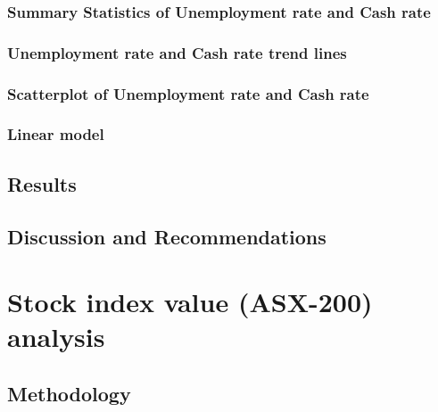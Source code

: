 \documentclass[11pt,a4paper,]{article}
\begin{document}
\hypertarget{summary-statistics-of-unemployment-rate-and-cash-rate}{%
\subsubsection{Summary Statistics of Unemployment rate and Cash rate}\label{summary-statistics-of-unemployment-rate-and-cash-rate}}

\hypertarget{unemployment-rate-and-cash-rate-trend-lines}{%
\subsubsection{Unemployment rate and Cash rate trend lines}\label{unemployment-rate-and-cash-rate-trend-lines}}

\hypertarget{scatterplot-of-unemployment-rate-and-cash-rate}{%
\subsubsection{Scatterplot of Unemployment rate and Cash rate}\label{scatterplot-of-unemployment-rate-and-cash-rate}}

\hypertarget{linear-model}{%
\subsubsection{Linear model}\label{linear-model}}

\hypertarget{results-1}{%
\subsection{Results}\label{results-1}}

\hypertarget{discussion-and-recommendations-1}{%
\subsection{Discussion and Recommendations}\label{discussion-and-recommendations-1}}

\hypertarget{stock-index-value-asx-200-analysis}{%
\section{Stock index value (ASX-200) analysis}\label{stock-index-value-asx-200-analysis}}

\hypertarget{methodology-2}{%
\subsection{Methodology}\label{methodology-2}}
\end{document}
